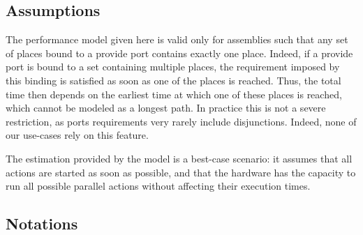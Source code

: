 \subsection{Assumptions}

The performance model given here is valid only for assemblies such that any set of places bound to a provide port contains exactly one place. Indeed, if a provide port is bound to a set containing multiple places, the requirement imposed by this binding is satisfied as soon as one of the places is reached. Thus, the total time then depends on the earliest time at which one of these places is reached, which cannot be modeled as a longest path. In practice this is not a severe restriction, as ports requirements very rarely include disjunctions. Indeed, none of our use-cases rely on this feature. %


The estimation provided by the model is a best-case scenario: it assumes that all actions are started as soon as possible, and that the hardware has the capacity to run all possible parallel actions without affecting their execution times.

\subsection{Notations}


